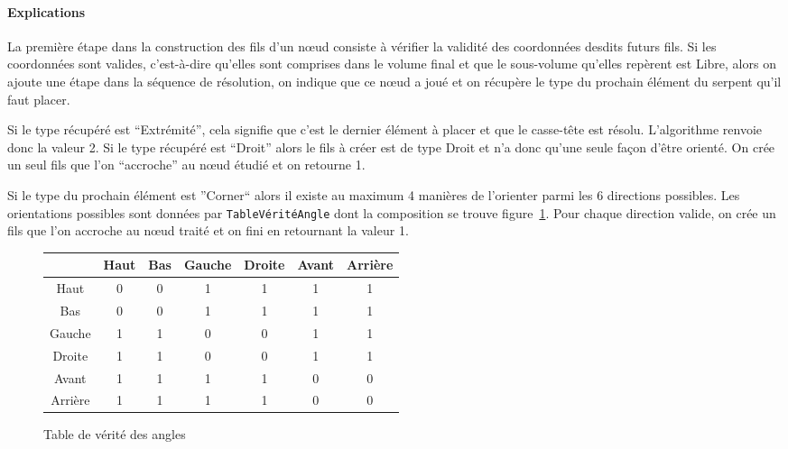 \paragraph{Explications} La première étape dans la construction des fils d'un nœud consiste à vérifier la validité des coordonnées desdits futurs fils. Si les coordonnées sont valides, c'est-à-dire qu'elles sont comprises dans le volume final et que le sous-volume qu'elles repèrent est Libre, alors on ajoute une étape dans la séquence de résolution, on indique que ce nœud a joué et on récupère le type du prochain élément du serpent qu'il faut placer.

Si le type récupéré est ``Extrémité'', cela signifie que c'est le dernier élément à placer et que le casse-tête est résolu. L'algorithme renvoie donc la valeur 2. Si le type récupéré est ``Droit'' alors le fils à créer est de type Droit et n'a donc qu'une seule façon d'être orienté. On crée un seul fils que l'on ``accroche'' au nœud étudié et on retourne 1.

Si le type du prochain élément est ''Corner`` alors il existe au maximum 4 manières de l'orienter parmi les 6 directions possibles. Les orientations possibles sont données par \verb|TableVéritéAngle| dont la composition se trouve figure~\ref{truthTable}. Pour chaque direction valide, on crée un fils que l'on accroche au nœud traité et on fini en retournant la valeur 1.

\begin{figure}
\begin{center}
\begin{tabular}{|*{7}{c|}}
\hline
~ & Haut & Bas & Gauche & Droite & Avant & Arrière \\
\hline
Haut & 0 & 0 & 1 & 1 & 1 & 1 \\
\hline
Bas & 0 & 0 & 1 & 1 & 1 & 1 \\
\hline
Gauche & 1 & 1 & 0 & 0 & 1 & 1 \\
\hline
Droite & 1 & 1 & 0 & 0 & 1 & 1 \\
\hline
Avant & 1 & 1 & 1 & 1 & 0 & 0 \\
\hline
Arrière & 1 & 1 & 1 & 1 & 0 & 0 \\
\hline
\end{tabular}
\end{center}
\caption{Table de vérité des angles}
\label{truthTable}
\end{figure}
